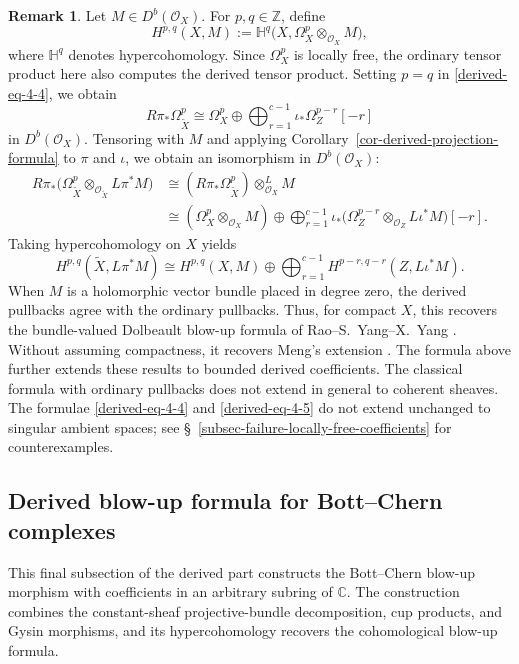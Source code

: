 \documentclass[11pt]{amsart}
\numberwithin{equation}{section}
\theoremstyle{plain}
\theoremstyle{definition}
\newtheorem{Rem}[thm]{Remark}
\begin{document}
\begin{Rem}\label{rem-derived-dolbeault-coefficients}\normalfont
Let $M\in D^b(\mathcal O_X)$.  For $p,q\in\mathbb Z$, define
\[
H^{p,q}(X,M):=\mathbb H^q\bigl(X,\Omega_X^p\otimes_{\mathcal O_X}M\bigr),
\]
where $\mathbb H^q$ denotes hypercohomology.  Since $\Omega_X^p$ is locally
free, the ordinary tensor product here also computes the derived tensor
product.  Setting $p=q$ in \eqref{derived-eq-4-4}, we obtain
\[
R\pi_*\Omega_{\tilde{X}}^p
\cong\Omega_X^p\oplus
\bigoplus_{r=1}^{c-1}\iota_*\Omega_Z^{p-r}[-r]
\]
in $D^b(\mathcal O_X)$.  Tensoring with $M$ and applying
Corollary~\ref{cor-derived-projection-formula} to $\pi$ and $\iota$, we obtain
an isomorphism in $D^b(\mathcal O_X)$:
\[
\begin{aligned}
R\pi_*\bigl(\Omega_{\tilde{X}}^p\otimes_{\mathcal O_{\tilde{X}}}L\pi^*M\bigr)
&\cong (R\pi_*\Omega_{\tilde{X}}^p)\otimes^L_{\mathcal O_X}M\\
&\cong (\Omega_X^p\otimes_{\mathcal O_X}M)\oplus
\bigoplus_{r=1}^{c-1}
\iota_*\bigl(\Omega_Z^{p-r}\otimes_{\mathcal O_Z}L\iota^*M\bigr)[-r].
\end{aligned}
\]
Taking hypercohomology on $X$ yields
\[
H^{p,q}(\tilde{X},L\pi^*M)
\cong H^{p,q}(X,M)\oplus
\bigoplus_{r=1}^{c-1}H^{p-r,q-r}(Z,L\iota^*M).
\]
When $M$ is a
holomorphic vector bundle placed in degree zero, the derived pullbacks
agree with the ordinary pullbacks.  Thus, for compact $X$, this recovers
the bundle-valued Dolbeault blow-up formula of Rao--S.~Yang--X.~Yang
\cite[Theorem 1.2]{RYY20}.  Without assuming compactness, it recovers
Meng's extension \cite[Theorem 6.6]{Mn19MV}.  The formula above further
extends these results to bounded derived coefficients.
The classical formula with ordinary pullbacks does not extend in general
to coherent sheaves.  The formulae \eqref{derived-eq-4-4} and
\eqref{derived-eq-4-5} do not extend unchanged to singular ambient spaces;
see \S~\ref{subsec-failure-locally-free-coefficients} for counterexamples.
\end{Rem}

\subsection{Derived blow-up formula for Bott--Chern complexes}

This final subsection of the derived part constructs the Bott--Chern
blow-up morphism with coefficients in an arbitrary subring of $\mathbb C$.
The construction combines the constant-sheaf projective-bundle
decomposition, cup products, and Gysin morphisms, and its hypercohomology
recovers the cohomological blow-up formula.
\end{document}
